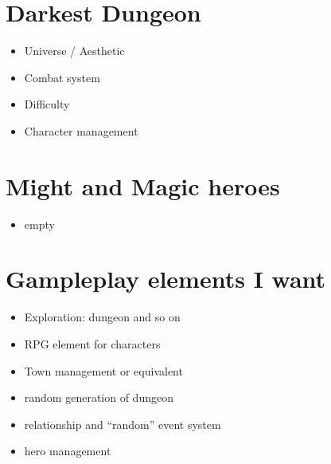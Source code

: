\documentclass{report}
\begin{document}
	\section*{Darkest Dungeon}
		\begin{itemize}
			\item Universe / Aesthetic
			\item Combat system
			\item Difficulty
			\item Character management

		\end{itemize}

	\section*{Might and Magic heroes}
		\begin{itemize}
			\item empty
		\end{itemize}

	\section{Gampleplay elements I want}	
	\begin{itemize}
		\item Exploration: dungeon and so on
		\item RPG element for characters
		\item Town management or equivalent
		\item random generation of dungeon
		\item relationship and “random” event system
		\item hero management
	\end{itemize}
 	
\end{document}
